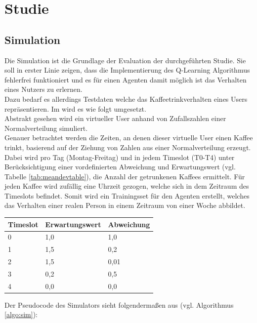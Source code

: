\chapter{Studie}
\label{kap:Kapitel04}

\section{Simulation}
Die Simulation ist die Grundlage der Evaluation der durchgeführten Studie. Sie soll in erster Linie zeigen, dass die Implementierung des Q-Learning Algorithmus fehlerfrei funktioniert und es für einen Agenten damit möglich ist das Verhalten eines Nutzers zu erlernen. \\
Dazu bedarf es allerdings Testdaten welche das Kaffeetrinkverhalten eines Users repräsentieren. Im  wird es wie folgt umgesetzt.\\
Abstrakt gesehen wird ein virtueller User anhand von Zufallszahlen einer Normalverteilung simuliert.\\
Genauer betrachtet werden die Zeiten, an denen dieser virtuelle User einen Kaffee trinkt, basierend auf der Ziehung von Zahlen aus einer Normalverteilung erzeugt.\\ Dabei wird pro Tag (Montag-Freitag) und in jedem Timeslot (T0-T4) unter Berücksichtigung einer vordefinierten Abweichung und Erwartungswert (vgl. Tabelle \ref{tab:meandevtable}), die Anzahl der getrunkenen Kaffees ermittelt. Für jeden Kaffee wird zufällig eine Uhrzeit gezogen, welche sich in dem Zeitraum des Timeslots befindet. Somit wird ein Trainingsset für den Agenten erstellt, welches das Verhalten einer realen Person in einem Zeitraum von einer Woche abbildet.

\begin{center}
    \label{tab:meandevtable}
    \begin{tabular}{| l | l | l |}
    \hline
    Timeslot & Erwartungswert & Abweichung \\ \hline
    0 & 1,0 & 1,0 \\ \hline
    1 & 1,5 & 0,2 \\ \hline
    2 & 1,5 & 0,01 \\ \hline
    3 & 0,2 & 0,5 \\ \hline
    4 & 0,0 & 0,0 \\ \hline
    \end{tabular}
\end{center}


Der Pseudocode des Simulators sieht folgendermaßen aus (vgl. Algorithmus \ref{algo:sim}):


